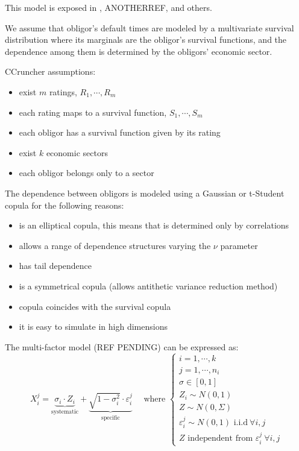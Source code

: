 \documentclass[a4paper,12pt,final]{article}
\begin{document}
This model is exposed in \cite{correlations:cmetrics}, ANOTHERREF, and others.
\newline

We assume that obligor's default times are modeled by a multivariate survival distribution
where its marginals are the obligor's survival functions, and the dependence among them is
determined by the obligors' economic sector.
\newline

CCruncher assumptions:
\begin{itemize}
  \setlength{\itemsep}{0pt}
  \setlength{\parskip}{0pt}
  \setlength{\parsep}{0pt}
\item exist $m$ ratings, $R_1,\cdots,R_m$
\item each rating maps to a survival function, $S_1,\cdots,S_m$
\item each obligor has a survival function given by its rating
\item exist $k$ economic sectors
\item each obligor belongs only to a sector
\end{itemize}

The dependence between obligors is modeled using a Gaussian or t-Student copula 
for the following reasons:
\begin{itemize}
\item is an elliptical copula, this means that is determined only by correlations
\item allows a range of dependence structures varying the $\nu$ parameter
\item has tail dependence
\item is a symmetrical copula (allows antithetic variance reduction method)
\item copula coincides with the survival copula
\item it is easy to simulate in high dimensions
\end{itemize}


The multi-factor model (REF PENDING) can be expressed as:
\begin{displaymath}
X_i^j = \underbrace{\sigma_i  \cdot Z_i}_\textrm{systematic} + \underbrace{\sqrt{1-\sigma_i^2} \cdot \varepsilon_i^j}_\textrm{specific}
\quad \textrm{ where }
\left\{
\begin{array}{l}
i = 1, \cdots, k \\
j=1,\cdots,n_i \\
\sigma \in [0,1] \\
Z_i \sim N(0,1) \\
Z \sim N(0,\Sigma) \\
\varepsilon_i^j \sim N(0,1) \textrm{ i.i.d} \ \forall i,j \\
Z \textrm{ independent from } \varepsilon_i^j \ \forall i,j
\end{array}
\right.
\end{displaymath}
\end{document}
